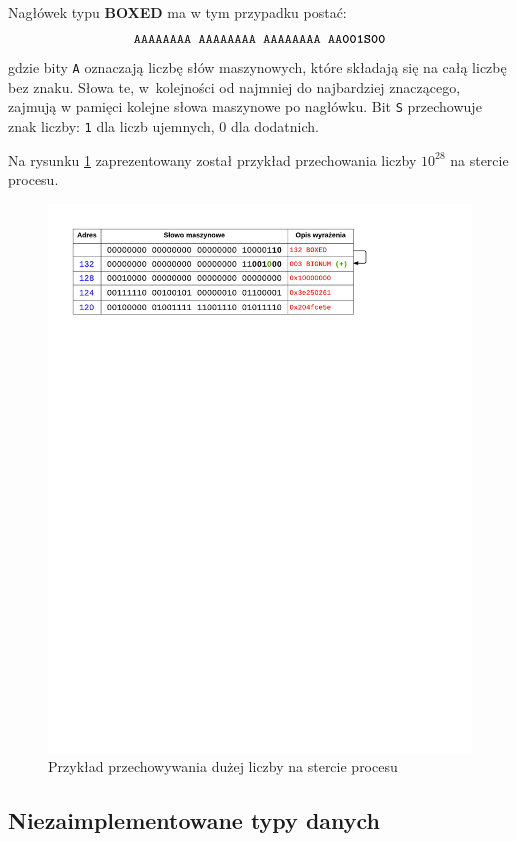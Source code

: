 Nagłówek typu \textbf{BOXED} ma w tym przypadku postać:
$$\texttt{AAAAAAAA AAAAAAAA AAAAAAAA AA\textbf{001S00}}$$
gdzie bity \texttt{A} oznaczają liczbę słów maszynowych, które składają się na całą liczbę bez znaku. Słowa te, w~kolejności od najmniej do najbardziej znaczącego, zajmują w pamięci kolejne słowa maszynowe po nagłówku. Bit \texttt{S} przechowuje znak liczby: \texttt{1} dla liczb ujemnych, {0} dla dodatnich.

Na rysunku \ref{fig:bignumonheap} zaprezentowany został przykład przechowania liczby $10^{28}$ na stercie procesu.

\begin{figure}[h]
\centerline{\includegraphics[scale=1, clip, trim=10mm 223mm 45mm 10mm]{bignum_on_heap}}
\caption{Przykład przechowywania dużej liczby na stercie procesu}
\label{fig:bignumonheap}
\end{figure}

\subsection{Niezaimplementowane typy danych}
\label{sub:typyNiezaimplementowane}

